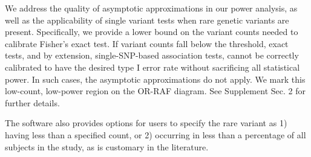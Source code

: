 We address the quality of asymptotic approximations in our power analysis, as well as the applicability of single variant tests when rare genetic variants are present.
Specifically, we provide a lower bound on the variant counts needed to calibrate Fisher's exact test. 
If variant counts fall below the threshold, exact tests, and by extension, single-SNP-based association tests, cannot be correctly calibrated to have the desired type I error rate  without sacrificing all statistical power.
In such cases, the asymptotic approximations do not apply.
We mark this low-count, low-power region on the OR-RAF diagram.
See Supplement Sec. 2 for further details.

The software also provides options for users to specify the rare variant as 1) having less than a specified count, or 2) occurring in less than a percentage of all subjects in the study, as is customary in the literature.




